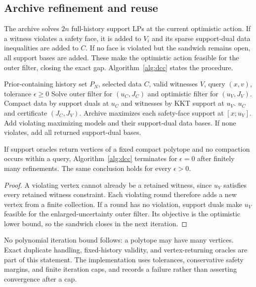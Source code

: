 \documentclass{l4dc2026}
\begin{document}
\subsection{Archive refinement and reuse}
The archive solves $2n$ full-history support LPs at the current optimistic action. If a witness violates a safety face, it is added to $V_i$ and its sparse support-dual data inequalities are added to $C$. If no face is violated but the sandwich remains open, all support bases are added. These make the optimistic action feasible for the outer filter, closing the exact gap. Algorithm~\ref{alg:dcc} states the procedure.

\begin{algorithm}[t]
\caption{Decision-certified compression (exact-arithmetic specification)}\label{alg:dcc}
\begin{algorithmic}[1]
\REQUIRE Prior-containing history set $P_N$, selected data $C$, valid witnesses $V$, query $(x,v)$, tolerance $\epsilon\geq0$
\LOOP
\STATE Solve outer filter for $(u_C,J_C)$ and optimistic filter for $(u_V,J_V)$.
\STATE Compact data by support duals at $u_C$ and witnesses by KKT support at $u_V$.
\RETURN $u_C$ and certificate $(J_C,J_V)$.
\ENDIF
\STATE Archive maximizes each safety-face support at $[x;u_V]$.
\STATE Add violating maximizing models and their support-dual data bases.
\STATE If none violates, add all returned support-dual bases.
\ENDLOOP
\end{algorithmic}
\end{algorithm}

\begin{proposition}\label{prop:finite}
If support oracles return vertices of a fixed compact polytope and no compaction occurs within a query, Algorithm~\ref{alg:dcc} terminates for $\epsilon=0$ after finitely many refinements. The same conclusion holds for every $\epsilon>0$.
\end{proposition}
\begin{proof}
A violating vertex cannot already be a retained witness, since $u_V$ satisfies every retained witness constraint. Each violating round therefore adds a new vertex from a finite collection. If a round has no violation, support duals make $u_V$ feasible for the enlarged-uncertainty outer filter. Its objective is the optimistic lower bound, so the sandwich closes in the next iteration.
\end{proof}
No polynomial iteration bound follows: a polytope may have many vertices. Exact duplicate handling, fixed-history validity, and vertex-returning oracles are part of this statement. The implementation uses tolerances, conservative safety margins, and finite iteration caps, and records a failure rather than asserting convergence after a cap.
\end{document}
